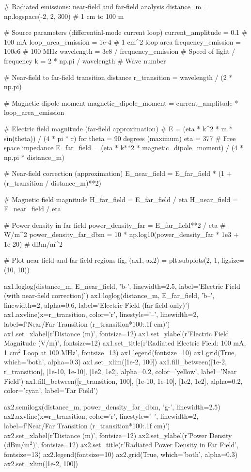 \documentclass[11pt,a4paper]{article}
\begin{document}
\begin{pycode}
# Radiated emissions: near-field and far-field analysis
distance_m = np.logspace(-2, 2, 300)  # 1 cm to 100 m

# Source parameters (differential-mode current loop)
current_amplitude = 0.1  # 100 mA
loop_area_emission = 1e-4  # 1 cm^2 loop area
frequency_emission = 100e6  # 100 MHz
wavelength = 3e8 / frequency_emission  # Speed of light / frequency
k = 2 * np.pi / wavelength  # Wave number

# Near-field to far-field transition distance
r_transition = wavelength / (2 * np.pi)

# Magnetic dipole moment
magnetic_dipole_moment = current_amplitude * loop_area_emission

# Electric field magnitude (far-field approximation)
# E = (eta * k^2 * m * sin(theta)) / (4 * pi * r) for theta = 90 degrees (maximum)
eta = 377  # Free space impedance
E_far_field = (eta * k**2 * magnetic_dipole_moment) / (4 * np.pi * distance_m)

# Near-field correction (approximation)
E_near_field = E_far_field * (1 + (r_transition / distance_m)**2)

# Magnetic field magnitude
H_far_field = E_far_field / eta
H_near_field = E_near_field / eta

# Power density in far field
power_density_far = E_far_field**2 / eta  # W/m^2
power_density_far_dbm = 10 * np.log10(power_density_far * 1e3 + 1e-20)  # dBm/m^2

# Plot near-field and far-field regions
fig, (ax1, ax2) = plt.subplots(2, 1, figsize=(10, 10))

ax1.loglog(distance_m, E_near_field, 'b-', linewidth=2.5, label='Electric Field (with near-field correction)')
ax1.loglog(distance_m, E_far_field, 'b--', linewidth=2, alpha=0.6, label='Electric Field (far-field only)')
ax1.axvline(x=r_transition, color='r', linestyle='--', linewidth=2, label=f'Near/Far Transition ({r_transition*100:.1f} cm)')
ax1.set_xlabel(r'Distance (m)', fontsize=12)
ax1.set_ylabel(r'Electric Field Magnitude (V/m)', fontsize=12)
ax1.set_title(r'Radiated Electric Field: 100 mA, 1 cm$^2$ Loop at 100 MHz', fontsize=13)
ax1.legend(fontsize=10)
ax1.grid(True, which='both', alpha=0.3)
ax1.set_xlim([1e-2, 100])
ax1.fill_between([1e-2, r_transition], [1e-10, 1e-10], [1e2, 1e2], alpha=0.2, color='yellow', label='Near Field')
ax1.fill_between([r_transition, 100], [1e-10, 1e-10], [1e2, 1e2], alpha=0.2, color='cyan', label='Far Field')

ax2.semilogx(distance_m, power_density_far_dbm, 'g-', linewidth=2.5)
ax2.axvline(x=r_transition, color='r', linestyle='--', linewidth=2, label=f'Near/Far Transition ({r_transition*100:.1f} cm)')
ax2.set_xlabel(r'Distance (m)', fontsize=12)
ax2.set_ylabel(r'Power Density (dBm/m$^2$)', fontsize=12)
ax2.set_title(r'Radiated Power Density in Far Field', fontsize=13)
ax2.legend(fontsize=10)
ax2.grid(True, which='both', alpha=0.3)
ax2.set_xlim([1e-2, 100])


\end{pycode}
\end{document}
